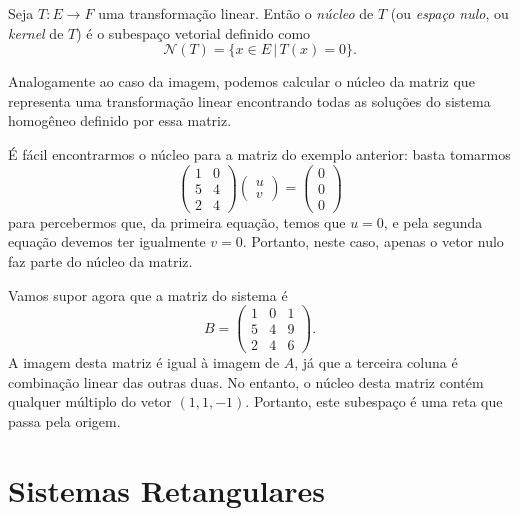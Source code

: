 \begin{defi}
	Seja $T:E\to F$ uma transformação linear. Então o \emph{núcleo} de $T$ (ou \emph{espaço nulo}, ou \emph{kernel} de $T$) é o subespaço vetorial definido como
    \begin{equation*}
    	{\mathcal{N}}(T) = \{ x \in E \, | \, T(x)=0 \}.
    \end{equation*}
\end{defi}

Analogamente ao caso da imagem, podemos calcular o núcleo da matriz que representa uma transformação linear encontrando todas as soluções do sistema homogêneo definido por essa matriz.

É fácil encontrarmos o núcleo para a matriz do exemplo anterior: basta tomarmos 
\begin{equation*}
   \begin{pmatrix}
      1 & 0\\
      5 & 4\\
      2 & 4
    \end{pmatrix}
    \begin{pmatrix}
      u\\
      v
    \end{pmatrix}
    = 
    \begin{pmatrix}
      0\\
      0\\
      0
    \end{pmatrix}
\end{equation*}
para percebermos que, da primeira equação, temos que $u=0$, e pela segunda equação devemos ter igualmente $v=0$. Portanto, neste caso, apenas o vetor nulo faz parte do núcleo da matriz.

Vamos supor agora que a matriz do sistema é
\begin{equation*}
  B = 
    \begin{pmatrix}
      1 & 0 & 1\\
      5 & 4 & 9\\
      2 & 4 & 6
    \end{pmatrix}.
\end{equation*}
A imagem desta matriz é igual à imagem de $A$, já que a terceira coluna é combinação linear das outras duas. No entanto, o núcleo desta matriz contém qualquer múltiplo do vetor $(1,1,-1)$. Portanto, este subespaço é uma reta que passa pela origem.


\section{Sistemas Retangulares}

